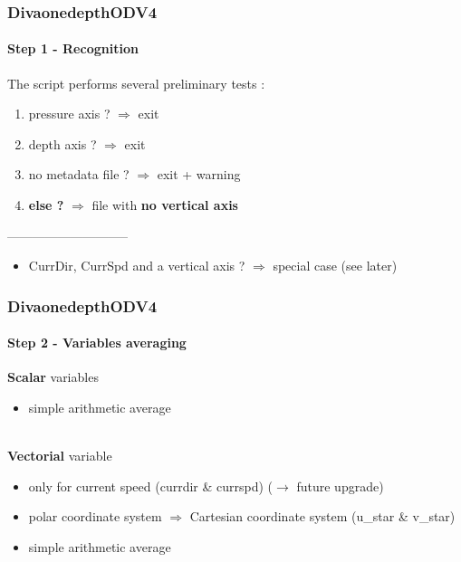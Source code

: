 \begin{frame}
\frametitle{DivaonedepthODV4}
\framesubtitle{Step 1 - Recognition}
The script performs several preliminary tests :
\begin{enumerate}
 \item pressure axis ? $\Rightarrow$ exit
 \item depth axis ? $\Rightarrow$ exit
 \item no metadata file ? $\Rightarrow$ exit + warning
 \item \textbf{else ?} $\Rightarrow$ file with \textbf{no vertical axis}
\end{enumerate}

\begin{center}
 -----------------------------
\end{center}

\begin{itemize}
 \item CurrDir, CurrSpd and a vertical axis ? $\Rightarrow$ special case (see later)
\end{itemize}


\end{frame}
\begin{frame}
\frametitle{DivaonedepthODV4}
\framesubtitle{Step 2 - Variables averaging}
\textbf{Scalar} variables
\begin{itemize}
 \item simple arithmetic average
\end{itemize}
~\\
\textbf{Vectorial} variable
\begin{itemize}
 \item only for current speed (currdir \& currspd) ($\rightarrow$ future upgrade)
 \item polar coordinate system $\Rightarrow$ Cartesian coordinate system (u\_star \& v\_star)
 \item simple arithmetic average
\end{itemize}


\end{frame}
